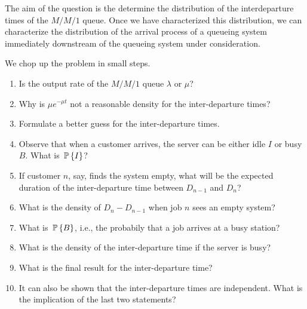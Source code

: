 \begin{question}\label{ex:dep}
  The aim of the question is the determine the distribution of the
  interdeparture times of the $M/M/1$ queue. Once we have
  characterized this distribution, we can characterize the
  distribution of the arrival process of a queueing system
  immediately downstream of the queueing system under
  consideration. 

We chop up the problem in small steps.
  \begin{enumerate}
  \item Is the output rate of the $M/M/1$ queue $\lambda$ or $\mu$?
  \item Why is $\mu e^{-\mu t}$ not a reasonable density for the
    inter-departure times?
  \item Formulate a better guess for the inter-departure times.
  \item Observe that when a customer arrives, the server can be either
    idle $I$ or busy $B$.  What is $\P{I}$?
  \item If customer $n$, say, finds the system empty, what will be the
    expected duration of the inter-departure time between $D_{n-1}$ and
    $D_n$?
  \item What is the density of $D_{n} - D_{n-1}$ when job $n$ sees an
    empty system?
  \item What is $\P{B}$, i.e., the probabily that a job arrives at a
    busy station?
  \item What is the density of the inter-departure time if the
    server is busy?
  \item What is the final result for the inter-departure time?
  \item It can also be shown that the inter-departure times are independent. What is the implication of the last two statements? 

  \end{enumerate}



\end{question}

